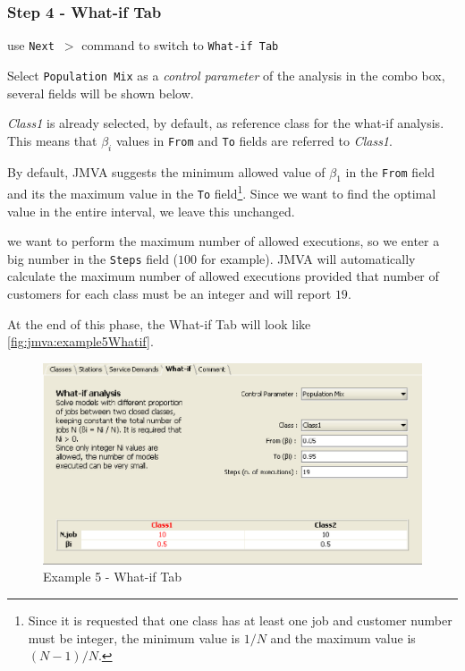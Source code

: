 \subsubsection{Step 4 - What-if Tab}
\begin{enumerate*}
    \item use \texttt{Next $>$} command to switch to \texttt{What-if Tab}
    \item Select \texttt{Population Mix} as a \emph{control parameter} of
    the analysis in the combo box, several fields will be shown below.
    \item \emph{Class1} is already selected, by default, as reference class for the what-if
    analysis. This means that $\beta_i$ values in \texttt{From} and
    \texttt{To} fields are referred to \emph{Class1}.
    \item By default, JMVA suggests the minimum allowed value of $\beta_1$
    in the \texttt{From} field and its the maximum value in the \texttt{To}
    field\footnote{Since it is requested that one class has at least one job and customer
    number must be integer, the minimum value is $1 / N$ and the maximum value is $(N-1)/N$.}.
    Since we want to find the optimal value in the entire
    interval, we leave this unchanged.
    \item we want to perform the maximum number of allowed
    executions, so we enter a big number in the \texttt{Steps} field ($100$ for
    example). JMVA will automatically calculate the maximum number
    of allowed executions provided that number of customers for each
    class must be an integer and will report $19$.
\end{enumerate*}
At the end of this phase, the What-if Tab will look like
\autoref{fig:jmva:example5Whatif}.

\begin{figure}[htbp]
    \begin{center}
        \includegraphics[scale=.5]{img/jmva/example5Whatif}
    \end{center}
    \caption{Example 5 - What-if Tab}
    \label{fig:jmva:example5Whatif}
\end{figure}


